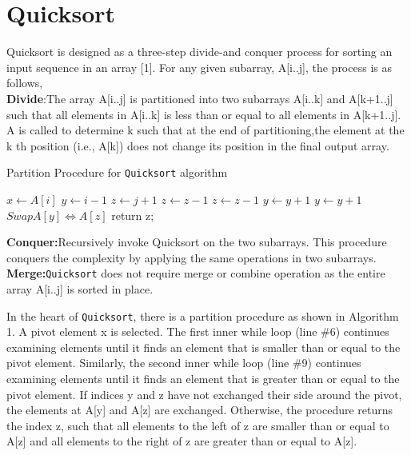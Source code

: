\documentclass[a4paper, 10pt,twocolumn]{article}
\begin{document}
\section{Quicksort}
Quicksort is designed as a three-step divide-and conquer process for sorting an input sequence in an array [1]. For any given subarray, A[i..j], the process is as follows,
\\\textbf{Divide}:The array A[i..j] is partitioned into two subarrays A[i..k] and A[k+1..j] such that all elements in A[i..k] is less than or equal to all elements in A[k+1..j]. A  is called to determine k such that at the end of partitioning,the element at the k th position (i.e., A[k]) does not change its position in the final output array.
\begin{algorithm}
  \caption{Partition Procedure for \texttt{Quicksort} algorithm}
  \begin{algorithmic}[1]
     \newline
     \newline
     \State $x \leftarrow A[i]$
     \State $y \leftarrow i-1$
     \State $z \leftarrow j+1$
        \State $z \leftarrow z-1$
            \State $z \leftarrow z-1$
        \EndWhile
        \State $y \leftarrow y+1$
            \State $y \leftarrow y+1$
        \EndWhile
            \State $ Swap A[y] \Leftrightarrow A[z] $
        \Else
            \State return z;
        \EndIf

     \EndWhile
     \EndProcedure
  \end{algorithmic}
\end{algorithm}
\newline
\newline
\textbf{Conquer:}Recursively invoke Quicksort on the two subarrays. This procedure conquers the complexity by applying the same operations in two subarrays.
\\\textbf{Merge:}\texttt{Quicksort} does not require merge or combine operation as the entire array A[i..j] is sorted in place.

In the heart of \texttt{Quicksort}, there is a partition procedure as shown in Algorithm 1. A pivot element x is selected. The first inner while loop (line \#6) continues examining elements until it finds an element that is smaller than or equal to the pivot element. Similarly, the second inner while loop (line \#9) continues examining elements until it finds an element that is greater than or equal to the pivot element. If indices y and z have not exchanged their side around the pivot, the elements at A[y] and A[z] are exchanged. Otherwise, the procedure returns the index z, such that all elements to the left of z are smaller than or equal to A[z] and all elements to the right of z are greater than or equal to A[z].
\end{document}
